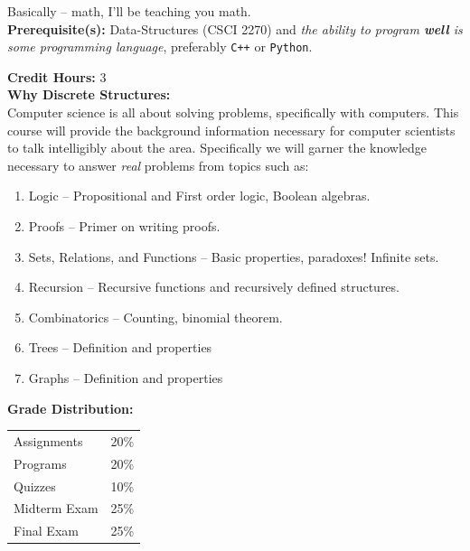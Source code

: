 \documentclass[11pt]{article}
\begin{document}
Basically -- math, I'll be teaching you math.\\
\textbf {Prerequisite(s):} Data-Structures (CSCI 2270) and \emph{the ability to program {\bf well} is some programming language}, preferably \texttt{C++} or \texttt{Python}.

\textbf {Credit Hours:} 3 \\

\textbf {\large Why Discrete Structures:} \\
Computer science is all about solving problems, specifically with computers. This course will provide the background information necessary for computer scientists to talk intelligibly about the area.
Specifically we will garner the knowledge necessary to answer \emph{real} problems from topics such as:
\begin{enumerate} \itemsep-0.4em
  \item Logic -- Propositional and First order logic, Boolean algebras.
  \item Proofs -- Primer on writing proofs.
  \item Sets, Relations, and Functions -- Basic properties, paradoxes! Infinite sets.
  \item Recursion -- Recursive functions and recursively defined structures.
  \item Combinatorics -- Counting, binomial theorem.
  \item Trees -- Definition and properties 
  \item Graphs -- Definition and properties
\end{enumerate}

\textbf {\large Grade Distribution:} \\
\hspace*{40mm}
\begin{tabular}{ l l }
Assignments & 20\% \\
Programs & 20\% \\
Quizzes  & 10\% \\
Midterm Exam  & 25\% \\
Final Exam  & 25\%
\end{tabular} \\\\
\end{document}
